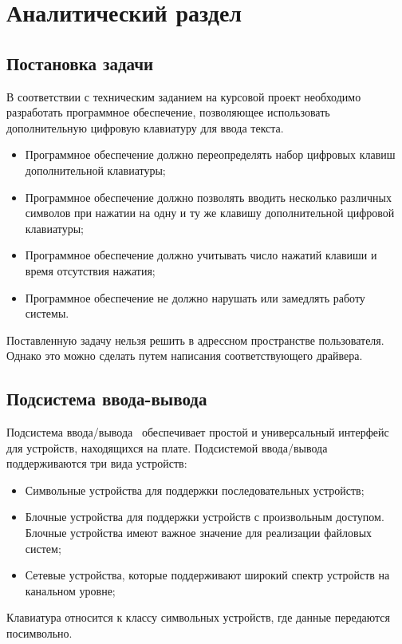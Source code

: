 \section{Аналитический раздел}

\subsection{Постановка задачи}
В соответствии с техническим заданием на курсовой проект необходимо разработать
программное обеспечение, позволяющее использовать дополнительную цифровую клавиатуру
для ввода текста.
\begin{itemize}
	\item Программное обеспечение должно переопределять
		набор цифровых клавиш дополнительной клавиатуры;
	\item Программное обеспечение должно позволять вводить несколько
		различных символов при нажатии на одну и ту же клавишу дополнительной
		цифровой клавиатуры;
	\item Программное обеспечение должно учитывать число нажатий клавиши
		и время отсутствия нажатия;
	\item Программное обеспечение не должно нарушать или замедлять работу системы.
\end{itemize}

Поставленную задачу нельзя решить в адрессном пространстве пользователя.
Однако это можно сделать путем написания соответствующего драйвера.

\subsection{Подсистема ввода-вывода}
Подсистема ввода/вывода \linux\ обеспечивает простой и универсальный интерфейс 
для устройств, находящихся на плате. Подсистемой ввода/вывода 
поддерживаются три вида устройств:
\begin{itemize}
	\item Символьные устройства для поддержки последовательных устройств;
	\item Блочные устройства для поддержки устройств с произвольным доступом. 
		Блочные устройства имеют важное значение для реализации файловых систем;
	\item Сетевые устройства, которые поддерживают широкий спектр устройств на канальном уровне;
\end{itemize}

Клавиатура относится к классу символьных устройств, где данные передаются посимвольно.
\newpar

